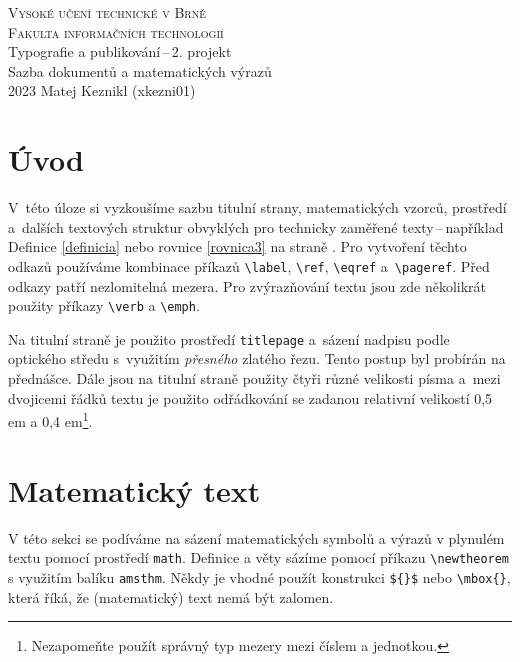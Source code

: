 \documentclass[a4paper, twocolumn, 11pt]{article}
\begin{document}
\begin{titlepage}
    \begin{center}
        {\Huge\textsc{Vysoké učení technické v Brně \\[0.5em]}}
        {\huge\textsc{Fakulta informačních technologií}}\\
        {\LARGE Typografie a publikování\,--\,2. projekt \\[0.4em]
        Sazba dokumentů a matematických výrazů}\\
        {\Large 2023 \hfill Matej Keznikl (xkezni01)}
    \end{center}
\end{titlepage}



\section*{Úvod}

V~této úloze si vyzkoušíme sazbu titulní strany, matematických vzorců, prostředí a~dalších textových struktur obvyklých pro technicky zaměřené texty\,--\,například Definice \ref{definicia} nebo rovnice \eqref{rovnica3} na straně \pageref{definicia}. Pro vytvoření těchto odkazů používáme kombinace příkazů \verb|\label|, \verb|\ref|, \verb|\eqref| a~\verb|\pageref|. Před odkazy patří nezlomitelná mezera. Pro zvýrazňování textu jsou zde několikrát použity příkazy \verb|\verb| a \verb|\emph|. 

Na titulní straně je použito prostředí \texttt{titlepage} a~sázení nadpisu podle optického středu s~využitím \emph{přesného} zlatého řezu. Tento postup byl probírán na přednášce. Dále jsou na titulní straně použity čtyři různé velikosti písma a~mezi dvojicemi řádků textu je použito odřádkování se zadanou relativní velikostí 0,5 em a 0,4 em\footnote[1]{Nezapomeňte použít správný typ mezery mezi číslem a jednotkou.}.

\section{Matematický text}
V této sekci se podíváme na sázení matematických symbolů a výrazů v plynulém textu pomocí prostředí \verb|math|. Definice a věty sázíme pomocí příkazu  \verb|\newtheorem| s využitím balíku \verb|amsthm|. Někdy je vhodné použít konstrukci \verb|${}$| nebo 
\verb|\mbox{}|, která říká, že (matematický) text nemá být zalomen. 
\end{document}
